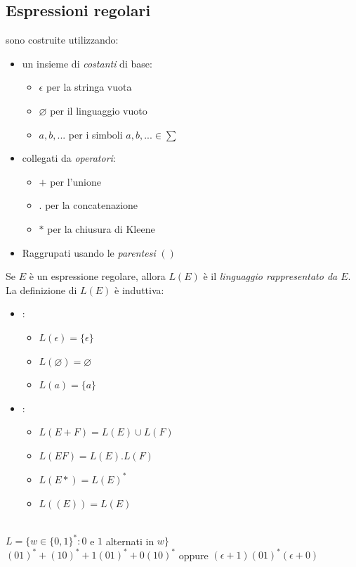 \subsection{Espressioni regolari}
sono costruite utilizzando:
\begin{itemize}
	\item un insieme di \textit{costanti} di base:
		\begin{itemize}
			\item $\epsilon$ per la stringa vuota
			\item $\varnothing$ per il linguaggio vuoto
			\item $a, b,...$ per i simboli $a,b,... \in \sum$
		\end{itemize}
	\item collegati da \textit{operatori}:
		\begin{itemize}
			\item $+$ per l'unione
			\item $.$ per la concatenazione
			\item $*$ per la chiusura di Kleene
		\end{itemize}
	\item Raggrupati usando le \textit{parentesi} $()$
\end{itemize}
Se $E$ è un espressione regolare, allora $L(E)$ è il \textit{linguaggio rappresentato da $E$}. La definizione di $L(E)$ è induttiva:
\begin{itemize}
	\item {}:
		\begin{itemize}
			\item $L(\epsilon) = \{ \epsilon \}$
			\item $L(\varnothing) = \varnothing$
			\item $L(a) = \{a\}$
		\end{itemize}
	\item {}:
		\begin{itemize}
			\item $L(E + F) = L(E) \cup L(F)$
			\item $L(EF) = L(E).L(F)$
			\item $L(E*) = L(E)^*$
			\item $L((E)) = L(E)$
		\end{itemize}
\end{itemize}
\\
$L=\{w \in \{0,1\}^* : 0$ e $1$ alternati in $w \}$\\
$(01)^* + (10)^* + 1(01)^* + 0(10)^*$ oppure $(\epsilon +1)(01)^*(\epsilon+0)$
